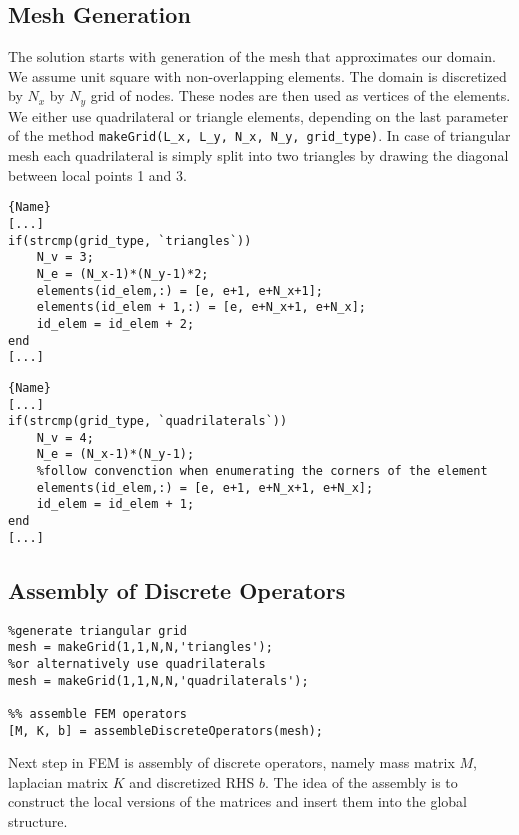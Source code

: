 \documentclass[unicode,11pt,a4paper,oneside,numbers=endperiod,openany]{scrartcl}
\begin{document}
\subsection{Mesh Generation}

The solution starts with generation of the mesh that approximates our domain. We assume unit square with non-overlapping elements. The domain is discretized by $N_x$ by $N_y$ grid of nodes. These nodes are then used as vertices of the elements. We either use quadrilateral or triangle elements, depending on the last parameter of the method \texttt{makeGrid(L\_x, L\_y, N\_x, N\_y, grid\_type)}. In case of triangular mesh each quadrilateral is simply split into two triangles by drawing the diagonal between local points 1 and 3.


\noindent\begin{minipage}{.45\textwidth}
\begin{lstlisting}[caption=Triangular mesh,frame=tlrb]{Name}
[...]
if(strcmp(grid_type, `triangles`))
    N_v = 3;
    N_e = (N_x-1)*(N_y-1)*2;
    elements(id_elem,:) = [e, e+1, e+N_x+1];
    elements(id_elem + 1,:) = [e, e+N_x+1, e+N_x];
    id_elem = id_elem + 2;
end
[...]
\end{lstlisting}
\end{minipage}\hfill
\begin{minipage}{.45\textwidth}
\begin{lstlisting}[caption=Quadrilateral mesh,frame=tlrb]{Name}
[...]
if(strcmp(grid_type, `quadrilaterals`))
    N_v = 4;
    N_e = (N_x-1)*(N_y-1);
    %follow convenction when enumerating the corners of the element
    elements(id_elem,:) = [e, e+1, e+N_x+1, e+N_x];
    id_elem = id_elem + 1;
end
[...]
\end{lstlisting}
\end{minipage}

\subsection{Assembly of Discrete Operators}
\begin{lstlisting}
%generate triangular grid
mesh = makeGrid(1,1,N,N,'triangles');
%or alternatively use quadrilaterals
mesh = makeGrid(1,1,N,N,'quadrilaterals');

%% assemble FEM operators 
[M, K, b] = assembleDiscreteOperators(mesh);
\end{lstlisting}

Next step in FEM is assembly of discrete operators, namely mass matrix $M$, laplacian matrix $K$ and discretized RHS $b$. The idea of the assembly is to construct the local versions of the matrices and insert them into the global structure. 
\end{document}
